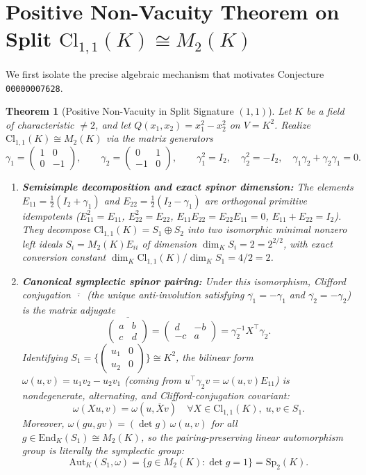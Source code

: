 \documentclass[11pt,a4paper]{article}
\newcommand{\smat}[4]{\left(\begin{smallmatrix}#1&#2\\#3&#4\end{smallmatrix}\right)}
\newtheorem{theorem}{Theorem}[section]
\theoremstyle{definition}
\newcommand{\Cl}{\mathrm{Cl}}
\newcommand{\End}{\mathrm{End}}
\newcommand{\Aut}{\mathrm{Aut}}
\newcommand{\Sp}{\mathrm{Sp}}
\begin{document}
\section{Positive Non-Vacuity Theorem on Split \texorpdfstring{$\Cl_{1,1}(K) \cong M_2(K)$}{Cl(1,1)(K)}}\label{sec:positive}

We first isolate the precise algebraic mechanism that motivates Conjecture \texttt{00000007628}.

\begin{theorem}[Positive Non-Vacuity in Split Signature $(1,1)$]\label{thm:positive}
Let $K$ be a field of characteristic $\neq 2$, and let $Q(x_1, x_2) = x_1^2 - x_2^2$ on $V = K^2$. Realize $\Cl_{1,1}(K) \cong M_2(K)$ via the matrix generators
\[
  \gamma_1 = \begin{pmatrix} 1 & 0 \\ 0 & -1 \end{pmatrix}, \qquad
  \gamma_2 = \begin{pmatrix} 0 & 1 \\ -1 & 0 \end{pmatrix}, \qquad
  \gamma_1^2 = I_2, \quad \gamma_2^2 = -I_2, \quad \gamma_1 \gamma_2 + \gamma_2 \gamma_1 = 0.
\]
\begin{enumerate}
  \item[(1)] \textbf{Semisimple decomposition and exact spinor dimension:} The elements $E_{11} = \frac{1}{2}(I_2 + \gamma_1)$ and $E_{22} = \frac{1}{2}(I_2 - \gamma_1)$ are orthogonal primitive idempotents ($E_{11}^2 = E_{11}$, $E_{22}^2 = E_{22}$, $E_{11}E_{22} = E_{22}E_{11} = 0$, $E_{11} + E_{22} = I_2$). They decompose $\Cl_{1,1}(K) = S_1 \oplus S_2$ into two isomorphic minimal nonzero left ideals $S_i = M_2(K)E_{ii}$ of dimension $\dim_K S_i = 2 = 2^{2/2}$, with exact conversion constant $\dim_K \Cl_{1,1}(K)/\dim_K S_1 = 4/2 = 2$.
  \item[(2)] \textbf{Canonical symplectic spinor pairing:} Under this isomorphism, Clifford conjugation $\overline{\,\cdot\,}$ (the unique anti-involution satisfying $\overline{\gamma_1} = -\gamma_1$ and $\overline{\gamma_2} = -\gamma_2$) is the matrix adjugate
  \[
    \overline{\begin{pmatrix} a & b \\ c & d \end{pmatrix}} = \begin{pmatrix} d & -b \\ -c & a \end{pmatrix} = \gamma_2^{-1} X^\top \gamma_2.
  \]
  Identifying $S_1 = \bigl\{\smat{u_1}{0}{u_2}{0}\bigr\} \cong K^2$, the bilinear form $\omega(u, v) = u_1 v_2 - u_2 v_1$ (coming from $u^\top \gamma_2 v = \omega(u, v) E_{11}$) is nondegenerate, alternating, and Clifford-conjugation covariant:
  \[
    \omega(X u, v) = \omega(u, \overline{X} v) \quad \forall X \in \Cl_{1,1}(K),\; u, v \in S_1.
  \]
  Moreover, $\omega(g u, g v) = (\det g)\,\omega(u, v)$ for all $g \in \End_K(S_1) \cong M_2(K)$, so the pairing-preserving linear automorphism group is literally the symplectic group:
  \[
    \Aut_K(S_1, \omega) = \{ g \in M_2(K) : \det g = 1 \} = \Sp_2(K).
  \]
\end{enumerate}
\end{theorem}
\end{document}
